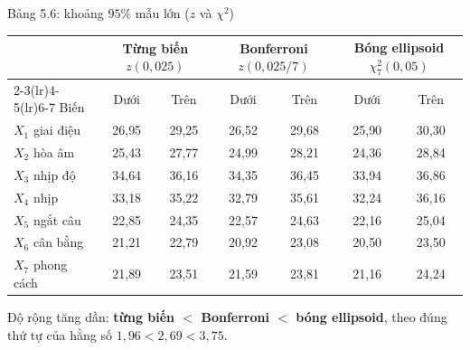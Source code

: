 \begin{frame}{Bảng 5.6: khoảng \texorpdfstring{\(95\%\)}{95\%} mẫu lớn (\texorpdfstring{\(z\)}{z} và \texorpdfstring{\(\chi^2\)}{chi-square})}
  \begin{center}
    \small
    \setlength{\tabcolsep}{5pt}
    \begin{tabular}{@{}l cc cc cc@{}}
      \toprule
      & \multicolumn{2}{c}{Từng biến \(z(0{,}025)\)}
      & \multicolumn{2}{c}{Bonferroni \(z(0{,}025/7)\)}
      & \multicolumn{2}{c}{Bóng ellipsoid \(\chi^2_7(0{,}05)\)} \\
      \cmidrule(lr){2-3}\cmidrule(lr){4-5}\cmidrule(lr){6-7}
      Biến & Dưới & Trên & Dưới & Trên & Dưới & Trên \\
      \midrule
      \(X_1\) giai điệu   & 26{,}95 & 29{,}25 & 26{,}52 & 29{,}68 & 25{,}90 & 30{,}30 \\
      \(X_2\) hòa âm      & 25{,}43 & 27{,}77 & 24{,}99 & 28{,}21 & 24{,}36 & 28{,}84 \\
      \(X_3\) nhịp độ     & 34{,}64 & 36{,}16 & 34{,}35 & 36{,}45 & 33{,}94 & 36{,}86 \\
      \(X_4\) nhịp        & 33{,}18 & 35{,}22 & 32{,}79 & 35{,}61 & 32{,}24 & 36{,}16 \\
      \(X_5\) ngắt câu    & 22{,}85 & 24{,}35 & 22{,}57 & 24{,}63 & 22{,}16 & 25{,}04 \\
      \(X_6\) cân bằng    & 21{,}21 & 22{,}79 & 20{,}92 & 23{,}08 & 20{,}50 & 23{,}50 \\
      \(X_7\) phong cách  & 21{,}89 & 23{,}51 & 21{,}59 & 23{,}81 & 21{,}16 & 24{,}24 \\
      \bottomrule
    \end{tabular}
  \end{center}
  \vspace{0.1cm}
  Độ rộng tăng dần: \textbf{từng biến \(<\) Bonferroni \(<\) bóng ellipsoid}, theo đúng thứ tự
  của hằng số \(1{,}96 < 2{,}69 < 3{,}75\).
\end{frame}

